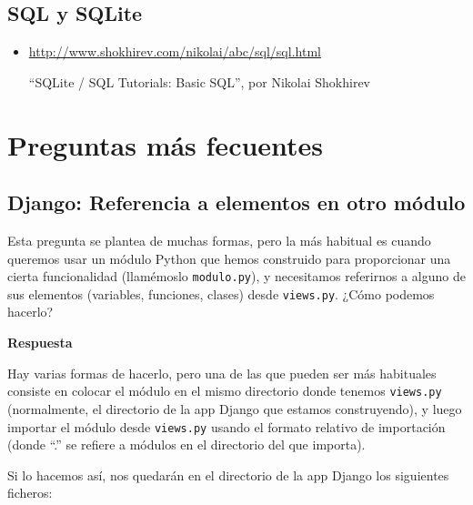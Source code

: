 \subsection{SQL y SQLite}


\begin{itemize}
\item \url{http://www.shokhirev.com/nikolai/abc/sql/sql.html}

``SQLite / SQL Tutorials: Basic SQL'', por Nikolai Shokhirev

\end{itemize}


\section{Preguntas más fecuentes}


\subsection{Django: Referencia a elementos en otro módulo}

Esta pregunta se plantea de muchas formas, pero la más habitual es cuando queremos usar un módulo Python que hemos construido para proporcionar una cierta funcionalidad (llamémoslo \verb|modulo.py|), y necesitamos referirnos a alguno de sus elementos (variables, funciones, clases) desde \verb|views.py|. ¿Cómo podemos hacerlo?

\textbf{Respuesta}

Hay varias formas de hacerlo, pero una de las que pueden ser más habituales consiste en colocar el módulo en el mismo directorio donde tenemos \verb|views.py| (normalmente, el directorio de la app Django que estamos construyendo), y luego importar el módulo desde \verb|views.py| usando el formato relativo de importación (donde ``.'' se refiere a módulos en el directorio del que importa).

Si lo hacemos así, nos quedarán en el directorio de la app Django los siguientes ficheros:


